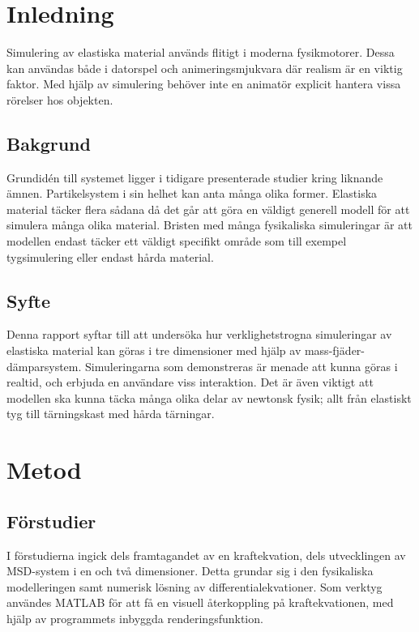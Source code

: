 \documentclass[a4paper,12pt,oneside,final,swedish]{extarticle}
\begin{document}
\pagebreak
\pagestyle{plain}
\setcounter{page}{1}

\section{Inledning}
Simulering av elastiska material används flitigt i moderna fysikmotorer. Dessa kan användas både i datorspel och animeringsmjukvara där realism är en viktig faktor. Med hjälp av simulering behöver inte en animatör explicit hantera vissa rörelser hos objekten.
\subsection{Bakgrund}
Grundidén till systemet ligger i tidigare presenterade studier kring liknande ämnen. Partikelsystem i sin helhet kan anta många olika former. Elastiska material täcker flera sådana då det går att göra en väldigt generell modell för att simulera många olika material. Bristen med många fysikaliska simuleringar är att modellen endast täcker ett väldigt specifikt område som till exempel tygsimulering eller endast hårda material.
\subsection{Syfte}
Denna rapport syftar till att undersöka hur verklighetstrogna simuleringar av elastiska material kan göras i tre dimensioner med hjälp av mass-fjäder-dämparsystem. Simuleringarna som demonstreras är menade att kunna göras i realtid, och erbjuda en användare viss interaktion. Det är även viktigt att modellen ska kunna täcka många olika delar av newtonsk fysik; allt från elastiskt tyg till tärningskast med hårda tärningar.

\section{Metod}
\subsection{Förstudier}
I förstudierna ingick dels framtagandet av en kraftekvation, dels utvecklingen av MSD-system i en och två dimensioner. Detta grundar sig i den fysikaliska modelleringen samt numerisk lösning av differentialekvationer. Som verktyg användes MATLAB för att få en visuell återkoppling på kraftekvationen, med hjälp av programmets inbyggda renderingsfunktion.
\end{document}
